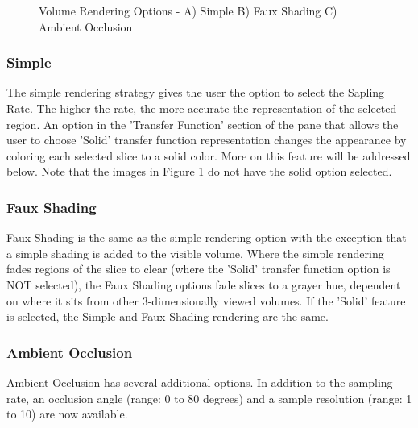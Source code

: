 \documentclass[fleqn,11pt,openany]{book}
\begin{document}
\begin{figure}[h!]
\caption{Volume Rendering Options - A) Simple B) Faux Shading C) Ambient Occlusion}\label{fig:VolRendOpt}
\end{figure}

\subsubsection{Simple}
The simple rendering strategy gives the user the option to select the Sapling Rate.
The higher the rate, the more accurate the representation of the selected region.
An option in the 'Transfer Function' section of the pane that allows the user to choose 'Solid' transfer function representation changes the appearance by coloring each selected slice to a solid color.
More on this feature will be addressed below.
Note that the images in Figure \ref{fig:VolRendOpt} do not have the solid option selected.

\subsubsection{Faux Shading}
Faux Shading is the same as the simple rendering option with the exception that a simple shading is added to the visible volume.
Where the simple rendering fades regions of the slice to clear (where the 'Solid' transfer function option is NOT selected), the Faux Shading options fade slices to a grayer hue, dependent on where it sits from other 3-dimensionally viewed volumes.
If the 'Solid' feature is selected, the Simple and Faux Shading rendering are the same.

\subsubsection{Ambient Occlusion}
Ambient Occlusion has several additional options.
In addition to the sampling rate, an occlusion angle (range: 0 to 80 degrees) and a sample resolution (range: 1 to 10) are now available.

\end{document}
